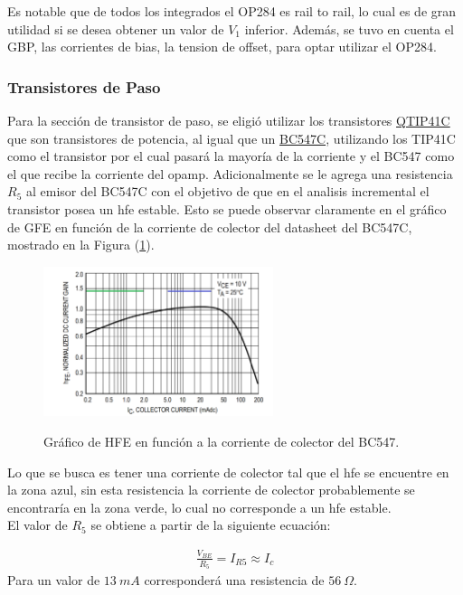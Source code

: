 Es notable que de todos los integrados el OP284 es rail to rail, lo cual es de gran utilidad si se desea obtener un valor de $V_1$ inferior. Además, se tuvo en cuenta el GBP, las corrientes de bias, la tension de offset, para optar utilizar el OP284.

\subsubsection{Transistores de Paso}

Para la sección de transistor de paso, se eligió utilizar los transistores \href{https://pdf1.alldatasheet.com/datasheet-pdf/view/532914/FAIRCHILD/TIP31C.html}{QTIP41C} que son transistores de potencia, al igual que un \href{https://pdf1.alldatasheet.com/datasheet-pdf/view/2895/MOTOROLA/BC547C.html}{BC547C}, utilizando los TIP41C como el transistor por el cual pasará la mayoría de la corriente y el BC547 como el que recibe la corriente del opamp.
Adicionalmente se le agrega una resistencia $R_5$ al emisor del BC547C con el objetivo de que en el analisis incremental el transistor posea un hfe estable. Esto se puede observar claramente en el gráfico de GFE en función de la corriente de colector del datasheet del BC547C, mostrado en la Figura (\ref{fig:hfe}).
\begin{figure}[H]
\centering
	\includegraphics[width=0.6\textwidth, page=1]{ImagenesEjercicio2/hfe547b.png}
	\label{fig:hfe}
	\caption{Gráfico de HFE en función a la corriente de colector del BC547.}
\end{figure}
Lo que se busca es tener una corriente de colector tal que el hfe se encuentre en la zona azul, sin esta resistencia la corriente de colector probablemente se encontraría en la zona verde, lo cual no corresponde a un hfe estable.\\ 

El valor de $R_5$ se obtiene a partir de la siguiente ecuación:

\begin{align}
\frac{V_{BE}}{R_5}=I_{R5}\approx I_c
\end{align}
Para un valor de $13 \ mA$ corresponderá una resistencia de $56 \ \Omega$.

